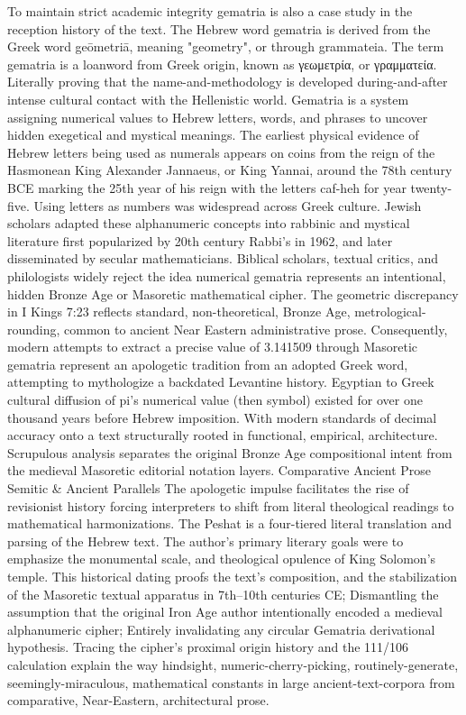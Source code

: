 To maintain strict academic integrity gematria is also a case study in the reception history of the text. The Hebrew word gematria is derived from the Greek word geōmetriā, meaning "geometry", or through grammateia. The term gematria is a loanword from Greek origin, known as γεωμετρία, or γραμματεία. Literally proving that the name-and-methodology is developed during-and-after intense cultural contact with the Hellenistic world. Gematria is a system assigning numerical values to Hebrew letters, words, and phrases to uncover hidden exegetical and mystical meanings. The earliest physical evidence of Hebrew letters being used as numerals appears on coins from the reign of the Hasmonean King Alexander Jannaeus, or King Yannai, around the 78th century BCE marking the 25th  year of his reign with the letters caf-heh for year twenty-five. Using letters as numbers was widespread across Greek culture. 
Jewish scholars adapted these alphanumeric concepts into rabbinic and mystical literature first popularized by 20th century Rabbi’s in 1962, and later disseminated by secular mathematicians. Biblical scholars, textual critics, and philologists widely reject the idea numerical gematria represents an intentional, hidden Bronze Age or Masoretic mathematical cipher. The geometric discrepancy in I Kings 7:23 reflects standard, non-theoretical, Bronze Age, metrological-rounding, common to ancient Near Eastern administrative prose. Consequently, modern attempts to extract a precise value of 3.141509 through Masoretic gematria represent an apologetic tradition from an adopted Greek word, attempting to mythologize a backdated Levantine history. Egyptian to Greek cultural diffusion of pi’s numerical value (then symbol) existed for over one thousand years before Hebrew imposition. With modern standards of decimal accuracy onto a text structurally rooted in functional, empirical, architecture. Scrupulous analysis separates the original Bronze Age compositional intent from the medieval Masoretic editorial notation layers.
Comparative Ancient Prose Semitic & Ancient Parallels
The apologetic impulse facilitates the rise of revisionist history forcing interpreters to shift from literal theological readings to mathematical harmonizations. The Peshat is a four-tiered literal translation and parsing of the Hebrew text. The author’s primary literary goals were to emphasize the monumental scale, and theological opulence of King Solomon’s temple. This historical dating proofs the text's composition, and the stabilization of the Masoretic textual apparatus in 7th–10th centuries CE; Dismantling the assumption that the original Iron Age author intentionally encoded a medieval alphanumeric cipher; Entirely invalidating any circular Gematria derivational hypothesis. Tracing the cipher’s proximal origin history and the 111/106 calculation explain the way hindsight, numeric-cherry-picking, routinely-generate, seemingly-miraculous, mathematical constants in large ancient-text-corpora from comparative, Near-Eastern, architectural prose. 
